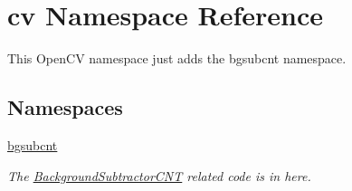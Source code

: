 \hypertarget{namespacecv}{}\section{cv Namespace Reference}
\label{namespacecv}


This Open\+CV namespace just adds the bgsubcnt namespace.  


\subsection*{Namespaces}
\begin{DoxyCompactItemize}
\item 
 \hyperlink{namespacecv_1_1bgsubcnt}{bgsubcnt}
\begin{DoxyCompactList}\small\item\em The \hyperlink{classcv_1_1bgsubcnt_1_1BackgroundSubtractorCNT}{Background\+Subtractor\+C\+NT} related code is in here. \end{DoxyCompactList}\end{DoxyCompactItemize}
